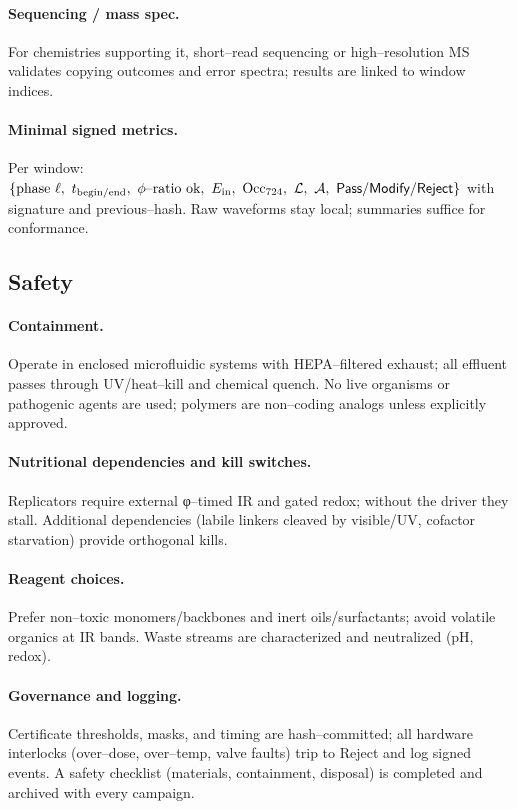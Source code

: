 \documentclass[11pt]{article}
\begin{document}
\paragraph{Sequencing / mass spec.}
For chemistries supporting it, short–read sequencing or high–resolution MS validates copying outcomes and error spectra; results are linked to window indices.

\paragraph{Minimal signed metrics.}
Per window: $\{\text{phase }\ell,\ t_{\rm begin/end},\ \phi\text{–ratio ok},\ E_{\mathrm{in}},\ \mathrm{Occ}_{724},\ \mathcal{L},\ \mathcal{A},\ \textsf{Pass/Modify/Reject}\}$ with signature and previous–hash. Raw waveforms stay local; summaries suffice for conformance.

\subsection{Safety}\label{sec:safety}
\paragraph{Containment.}
Operate in enclosed microfluidic systems with HEPA–filtered exhaust; all effluent passes through UV/heat–kill and chemical quench. No live organisms or pathogenic agents are used; polymers are non–coding analogs unless explicitly approved.

\paragraph{Nutritional dependencies and kill switches.}
Replicators require external φ–timed IR and gated redox; without the driver they stall. Additional dependencies (labile linkers cleaved by visible/UV, cofactor starvation) provide orthogonal kills.

\paragraph{Reagent choices.}
Prefer non–toxic monomers/backbones and inert oils/surfactants; avoid volatile organics at IR bands. Waste streams are characterized and neutralized (pH, redox).

\paragraph{Governance and logging.}
Certificate thresholds, masks, and timing are hash–committed; all hardware interlocks (over–dose, over–temp, valve faults) trip to \textsf{Reject} and log signed events. A safety checklist (materials, containment, disposal) is completed and archived with every campaign.
\end{document}
